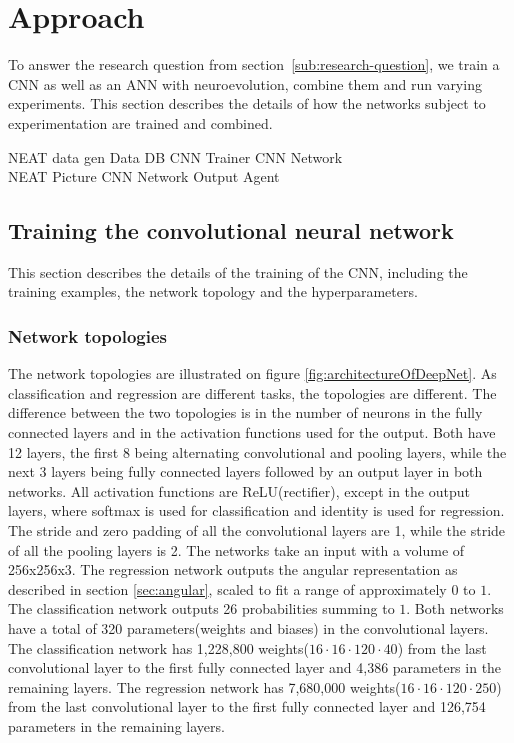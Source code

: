 
\section{Approach}
To answer the research question from section~\ref{sub:research-question}, we train a CNN as well as an ANN with neuroevolution, combine them and run varying experiments. This section describes the details of how the networks subject to experimentation are trained and combined.

NEAT data gen \textrightarrow{} Data  \textrightarrow{} DB \textrightarrow{} CNN Trainer  \textrightarrow{} CNN Network
\\
NEAT \textrightarrow{} Picture \textrightarrow{} CNN Network \textrightarrow{} Output \textrightarrow{} Agent
\\

\subsection{Training the convolutional neural network}
This section describes the details of the training of the CNN, including the training examples, the network topology and the hyperparameters.

\subsubsection{Network topologies}
The network topologies are illustrated on figure \ref{fig:architectureOfDeepNet}. As classification and regression are different tasks, the topologies are different. The difference between the two topologies is in the number of neurons in the fully connected layers and in the activation functions used for the output. Both have 12 layers, the first 8 being alternating convolutional and pooling layers, while the next 3 layers being fully connected layers followed by an output layer in both networks. All activation functions are ReLU(rectifier), except in the output layers, where softmax is used for classification and identity is used for regression. The stride and zero padding of all the convolutional layers are 1, while the stride of all the pooling layers is 2. The networks take an input with a volume of 256x256x3. The regression network outputs the angular representation as described in section \ref{sec:angular}, scaled to fit a range of approximately $0$ to $1$. The classification network outputs 26 probabilities summing to $1$. Both networks have a total of 320 parameters(weights and biases) in the convolutional layers.
The classification network has 1,228,800 weights($16 \cdot 16 \cdot 120 \cdot 40$) from the last convolutional layer to the first fully connected layer and 4,386 parameters in the remaining layers.
The regression network has 7,680,000 weights($16 \cdot 16 \cdot 120 \cdot 250$) from the last convolutional layer to the first fully connected layer and 126,754 parameters in the remaining layers.

